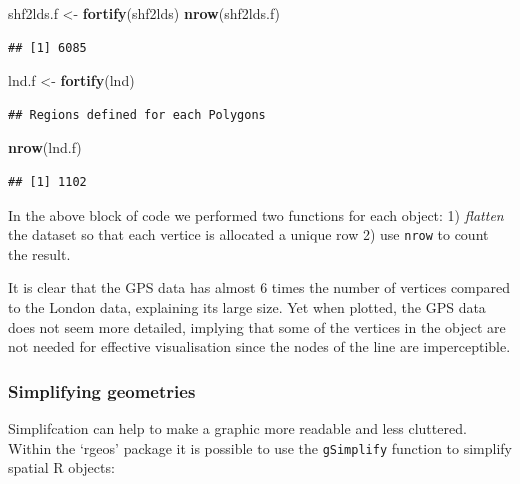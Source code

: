 \documentclass[]{article}
\newenvironment{Shaded}{}{}
\newcommand{\KeywordTok}[1]{\textcolor[rgb]{0.00,0.44,0.13}{\textbf{{#1}}}}
\newcommand{\NormalTok}[1]{{#1}}
\begin{document}
\begin{Shaded}
\begin{Highlighting}[]
\NormalTok{shf2lds.f <- }\KeywordTok{fortify}\NormalTok{(shf2lds)}
\KeywordTok{nrow}\NormalTok{(shf2lds.f)}
\end{Highlighting}
\end{Shaded}
\begin{verbatim}
## [1] 6085
\end{verbatim}
\begin{Shaded}
\begin{Highlighting}[]

\NormalTok{lnd.f <- }\KeywordTok{fortify}\NormalTok{(lnd)}
\end{Highlighting}
\end{Shaded}
\begin{verbatim}
## Regions defined for each Polygons
\end{verbatim}
\begin{Shaded}
\begin{Highlighting}[]
\KeywordTok{nrow}\NormalTok{(lnd.f)}
\end{Highlighting}
\end{Shaded}
\begin{verbatim}
## [1] 1102
\end{verbatim}
In the above block of code we performed two functions for each object:
1) \emph{flatten} the dataset so that each vertice is allocated a unique
row 2) use \texttt{nrow} to count the result.

It is clear that the GPS data has almost 6 times the number of vertices
compared to the London data, explaining its large size. Yet when
plotted, the GPS data does not seem more detailed, implying that some of
the vertices in the object are not needed for effective visualisation
since the nodes of the line are imperceptible.

\subsubsection{Simplifying geometries}

Simplifcation can help to make a graphic more readable and less
cluttered. Within the `rgeos' package it is possible to use the
\texttt{gSimplify} function to simplify spatial R objects:
\end{document}
